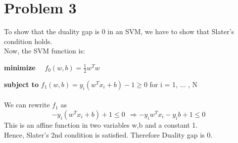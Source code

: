 \documentclass[10pt, a4paper, fleqn]{article}
\begin{document}
\section{Problem 3}
To show that the duality gap is 0 in an SVM, we have to show that Slater's condition holds.\\
Now, the SVM function is:\par
\textbf{minimize}  \ \   $f_0(w,b) = \frac{1}{2}w^Tw$\par
\textbf{subject to} $f_1(w,b) = y_i(w^Tx_i + b) -1 \geq 0$  for i = 1, ... , N
\\ \\
We can rewrite $f_1$ as
\begin{equation*}
-y_i(w^Tx_i + b) +1 \leq 0 \ \ 
\Rightarrow -y_i w^Tx_i - y_i b +1 \leq 0
\end{equation*}
This is an affine function in two variables w,b and a constant 1. \\
Hence, Slater's 2nd condition is satisfied. Therefore Duality gap is 0.
\end{document}
